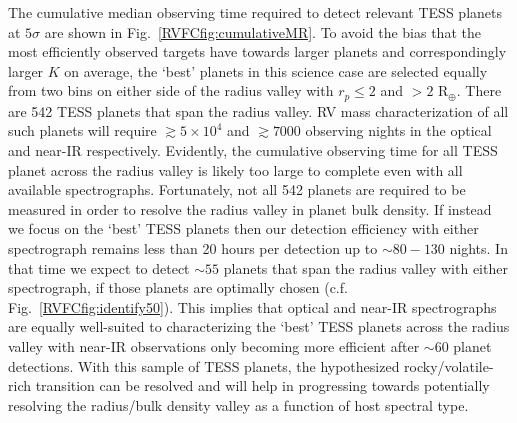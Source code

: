 The cumulative median observing time required to detect relevant TESS planets at $5\sigma$ are
shown in Fig.~\ref{RVFCfig:cumulativeMR}. To avoid the bias that the most efficiently observed targets
have towards larger planets and correspondingly larger $K$ on average, the `best' planets in this science
case are selected equally from two bins on either side of the radius valley with $r_p \leq 2$ and
$>2$ R$_{\oplus}$. There are 542 TESS planets that span the radius valley.
RV mass characterization of all such planets will require $\gtrsim 5 \times 10^4$ and $\gtrsim 7000$
observing nights in the optical and near-IR respectively.
Evidently, the cumulative observing time for all TESS planet across the radius valley is
likely too large to complete even with all available spectrographs. Fortunately, not all
542 planets are required to be measured in order to resolve the radius valley in
planet bulk density. If instead we focus on the `best' TESS planets then our detection
efficiency with either spectrograph remains less than 20 hours per detection up to
$\sim 80-130$ nights.
In that time we expect to detect $\sim 55$ planets that span the radius valley with either
spectrograph, if those planets are optimally chosen (c.f. Fig.~\ref{RVFCfig:identify50}).
This implies that optical and near-IR spectrographs are equally well-suited to characterizing
the `best' TESS planets across the radius valley with near-IR observations
only becoming more efficient after $\sim 60$ planet detections.
With this sample of TESS planets, the hypothesized rocky/volatile-rich transition can be resolved
and will help in progressing towards potentially resolving the radius/bulk density valley as
a function of host spectral type.

